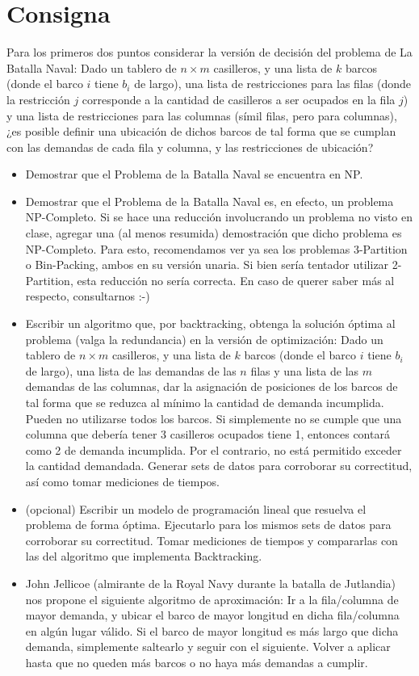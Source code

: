 \section*{Consigna}
Para los primeros dos puntos considerar la versión de decisión del problema de La Batalla Naval:  
Dado un tablero de $n \times m$ casilleros, y una lista de $k$ barcos (donde el barco $i$ tiene $b_i$ de largo), una lista de restricciones para las filas (donde la restricción $j$ corresponde a la cantidad de casilleros a ser ocupados en la fila $j$) y una lista de restricciones para las columnas (símil filas, pero para columnas), ¿es posible definir una ubicación de dichos barcos de tal forma que se cumplan con las demandas de cada fila y columna, y las restricciones de ubicación?

\begin{itemize}
    \item Demostrar que el Problema de la Batalla Naval se encuentra en NP.
    \item Demostrar que el Problema de la Batalla Naval es, en efecto, un problema NP-Completo.  
    Si se hace una reducción involucrando un problema no visto en clase, agregar una (al menos resumida) demostración que dicho problema es NP-Completo.  
    Para esto, recomendamos ver ya sea los problemas 3-Partition o Bin-Packing, ambos en su versión unaria. Si bien sería tentador utilizar 2-Partition, esta reducción no sería correcta. En caso de querer saber más al respecto, consultarnos :-)
    \item Escribir un algoritmo que, por backtracking, obtenga la solución óptima al problema (valga la redundancia) en la versión de optimización:  
    Dado un tablero de $n \times m$ casilleros, y una lista de $k$ barcos (donde el barco $i$ tiene $b_i$ de largo), una lista de las demandas de las $n$ filas y una lista de las $m$ demandas de las columnas, dar la asignación de posiciones de los barcos de tal forma que se reduzca al mínimo la cantidad de demanda incumplida.  
    Pueden no utilizarse todos los barcos. Si simplemente no se cumple que una columna que debería tener 3 casilleros ocupados tiene 1, entonces contará como 2 de demanda incumplida. Por el contrario, no está permitido exceder la cantidad demandada.  
    Generar sets de datos para corroborar su correctitud, así como tomar mediciones de tiempos.
    \item (opcional) Escribir un modelo de programación lineal que resuelva el problema de forma óptima. Ejecutarlo para los mismos sets de datos para corroborar su correctitud. Tomar mediciones de tiempos y compararlas con las del algoritmo que implementa Backtracking.
    \item John Jellicoe (almirante de la Royal Navy durante la batalla de Jutlandia) nos propone el siguiente algoritmo de aproximación:  
    Ir a la fila/columna de mayor demanda, y ubicar el barco de mayor longitud en dicha fila/columna en algún lugar válido. Si el barco de mayor longitud es más largo que dicha demanda, simplemente saltearlo y seguir con el siguiente.  
    Volver a aplicar hasta que no queden más barcos o no haya más demandas a cumplir.


\end{itemize}
